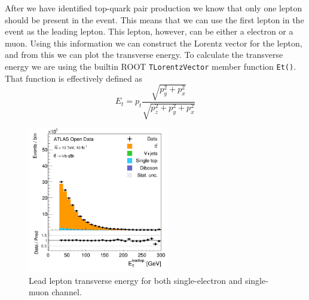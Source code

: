 \documentclass[12pt,a4paper]{article}
\begin{document}
After we have identified top-quark pair production we know that only one lepton
should be present in the event. This means that we can use the first lepton in
the event as the leading lepton. This lepton, however, can be either a electron
or a muon. Using this information we can construct the Lorentz vector for the
lepton, and from this we can plot the transverse energy. To calculate the
transverse energy we are using the builtin ROOT \texttt{TLorentzVector} member
function \texttt{Et()}. That function is effectively defined as
\begin{equation}
  E_t = p_t \frac{\sqrt{p_y^2+p_x^2}}{\sqrt{p_z^2+p_y^2+p_x^2}}
\end{equation}
\begin{figure}[H]
  \centering
  \includegraphics[width=0.55\textwidth]{figures/hist_leadleptEt}
  \caption{\label{fig:lepEt}Lead lepton transverse energy for both single-electron and single-muon channel.}
\end{figure}
\end{document}
